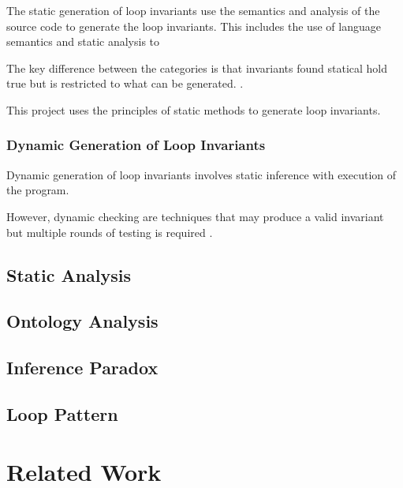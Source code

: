 The static generation of loop invariants use the
semantics and analysis of the source code to generate the loop invariants.
This includes the use of language semantics and static analysis to 

The key difference between the categories is
that invariants found statical hold true
but is restricted to what can be generated.
\cite{benderfinding}\cite{Leino2005LoopIO}.

This project uses the principles of static methods to
generate loop invariants.

\subsubsection{Dynamic Generation of Loop Invariants}

Dynamic generation of loop invariants involves static inference
with execution of the program.


However, dynamic checking are techniques that may produce
a valid invariant but multiple rounds of testing is required
\cite{infer-dynamic} \cite{infer-postconditions}.

\subsection{Static Analysis}

\subsection{Ontology Analysis}

\subsection{Inference Paradox}

\cite{infer-postconditions}

\subsection{Loop Pattern}

\cite{patterns}

\section{Related Work}

